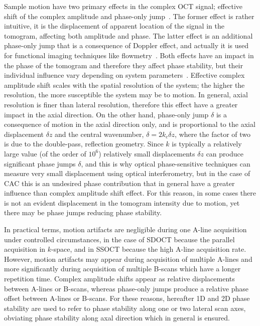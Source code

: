 Sample motion have two primary effects in the complex OCT signal; effective shift of the complex amplitude and phase-only jump~\cite{Chen1997_Optical, White2003_vivo, Shemonski2014_Stability}. The former effect is rather intuitive, it is the displacement of apparent location of the signal in the tomogram, affecting both amplitude and phase. The latter effect is an additional phase-only jump that is a consequence of Doppler effect, and actually it is used for functional imaging techniques like flowmetry~\cite{Braaf2019_OCTBased}. Both effects have an impact in the phase of the tomogram and therefore they affect phase stability, but their individual influence vary depending on system parameters~\cite{Shemonski2014_Stability}. Effective complex amplitude shift scales with the spatial resolution of the system; the higher the resolution, the more susceptible the system may be to motion. In general, axial resolution is finer than lateral resolution, therefore this effect have a greater impact in the axial direction. On the other hand, phase-only jump $\delta$ is a consequence of motion in the axial direction only, and is proportional to the axial displacement $\delta z$ and the central wavenumber, $\delta = 2k_c\delta z$, where the factor of two is due to the double-pass, reflection geometry. Since $k$ is typically a relatively large value (of the order of $10^6$) relatively small displacements $\delta z$ can produce significant phase jumps $\delta$, and this is why optical phase-sensitive techniques can measure very small displacement using optical interferometry, but in the case of CAC this is an undesired phase contribution that in general have a greater influence than complex amplitude shift effect. For this reason, in some cases there is not an evident displacement in the tomogram intensity due to motion, yet there may be phase jumps reducing phase stability.

In practical terms, motion artifacts are negligible during one A-line acquisition under controlled circumstances, in the case of SDOCT because the parallel acquisition in $k$-space, and in SSOCT because the high A-line acquisition rate. However, motion artifacts may appear during acquisition of multiple A-lines and more significantly during acquisition of multiple B-scans which have a longer repetition time. Complex amplitude shifts appear as relative displacements between A-lines or B-scans, whereas phase-only jumps produce a relative phase offset between A-lines or B-scans. For these reasons, hereafter 1D and 2D phase stability are used to refer to phase stability along one or two lateral scan axes, obviating phase stability along axal direction which in general is ensured.

